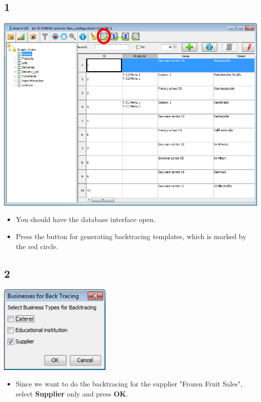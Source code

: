 \documentclass{beamer}
\begin{document}
\subsection{1}
\begin{frame}
	\begin{center}
  		\includegraphics[height=0.6\textheight]{1.png}
	\end{center}
	\begin{itemize}
		\item You should have the database interface open.
		\item Press the button for generating backtracing templates, which is marked by the red circle.
	\end{itemize}
\end{frame}

\subsection{2}
\begin{frame}
	\begin{center}
  		\includegraphics[width=0.4\textwidth]{2.png}
	\end{center}
	\begin{itemize}
		\item Since we want to do the backtracing for the supplier "Frozen Fruit Sales", select \textbf{Supplier} only and press \textbf{OK}.
	\end{itemize}
\end{frame}
\end{document}
